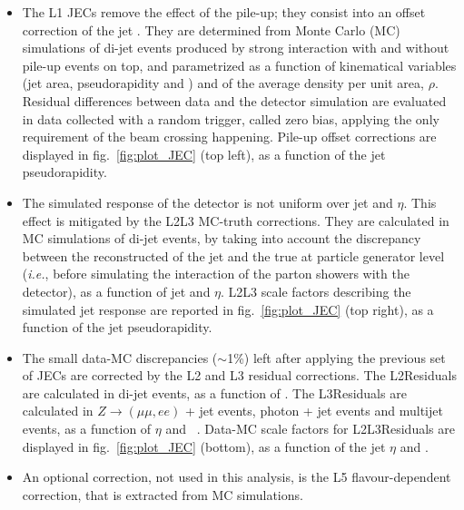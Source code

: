 \begin{itemize}
\item The L1 JECs remove the effect of the pile-up; they consist into an offset correction of the jet \pt. They are determined from Monte Carlo (MC) simulations of di-jet events produced by strong interaction with and without pile-up events on top, and parametrized as a function of kinematical variables (jet area, pseudorapidity and \pt) and of the average \pt density per unit area, $\rho$. Residual differences between data and the detector simulation are evaluated in data collected with a random trigger, called zero bias, applying the only requirement of the beam crossing happening. Pile-up offset corrections are displayed in fig.~\ref{fig:plot_JEC} (top left), as a function of the jet pseudorapidity.
\item The simulated response of the detector is not uniform over jet \pt and $\eta$. This effect is mitigated by the L2L3 MC-truth corrections. They are calculated in MC simulations of di-jet events, by taking into account the discrepancy between the reconstructed \pt of the jet and the true \pt at particle generator level (\textit{i.e.}, before simulating the interaction of the parton showers with the detector), as a function of jet \pt and $\eta$. L2L3 scale factors describing the simulated jet response are reported in fig.~\ref{fig:plot_JEC} (top right), as a function of the jet pseudorapidity.
\item The small data-MC discrepancies ($\sim$1\%) left after applying the previous set of JECs are corrected by the L2 and L3 residual corrections. The L2Residuals are calculated in di-jet events, as a function of \pt. The L3Residuals are calculated in $Z \rightarrow (\mu \mu, ee)$ + jet events, photon + jet events and multijet events, as a function of $\eta$ and \pt%
~\cite{bib:1748-0221-6-11-P11002}. Data-MC scale factors for L2L3Residuals are displayed in fig.~\ref{fig:plot_JEC} (bottom), as a function of the jet $\eta$ and \pt.
\item An optional correction, not used in this analysis, is the L5 flavour-dependent correction, that is extracted from MC simulations.
\end{itemize}

